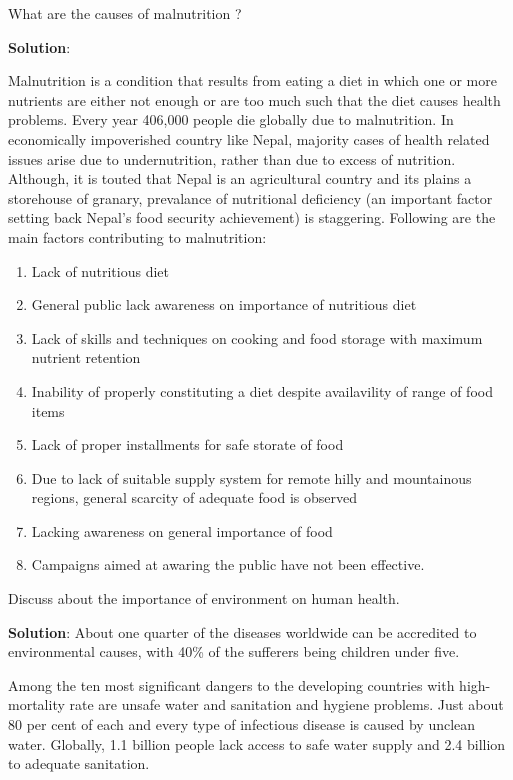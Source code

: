 \documentclass[
  openany]{book}
\newcommand{\question}{\item}
\newenvironment{solution}{ {\bfseries Solution}:}{}
\begin{document}
\begin{questions}

\question What are the causes of malnutrition ?

\begin{solution}

Malnutrition is a condition that results from eating a diet in which one or more nutrients are either not enough or are too much such that the diet causes health problems. Every year 406,000 people die globally due to malnutrition. In economically impoverished country like Nepal, majority cases of health related issues arise due to undernutrition, rather than due to excess of nutrition. Although, it is touted that Nepal is an agricultural country and its plains a storehouse of granary, prevalance of nutritional deficiency (an important factor setting back Nepal's food security achievement) is staggering. Following are the main factors contributing to malnutrition:

\begin{enumerate}
\item Lack of nutritious diet
\item General public lack awareness on importance of nutritious diet
\item Lack of skills and techniques on cooking and food storage with maximum nutrient retention
\item Inability of properly constituting a diet despite availavility of range of food items
\item Lack of proper installments for safe storate of food
\item Due to lack of suitable supply system for remote hilly and mountainous regions, general scarcity of adequate food is observed
\item Lacking awareness on general importance of food
\item Campaigns aimed at awaring the public have not been effective.
\end{enumerate}
\end{solution}

\question Discuss about the importance of environment on human health.

\begin{solution}
About one quarter of the diseases worldwide can be accredited to environmental causes, with 40\% of the sufferers being children under five.

Among the ten most significant dangers to the developing countries with high-mortality rate are unsafe water and sanitation and hygiene problems. Just about 80 per cent of each and every type of infectious disease is caused by unclean water. Globally, 1.1 billion people lack access to safe water supply and 2.4 billion to adequate sanitation.


\end{solution}
\end{questions}
\end{document}
